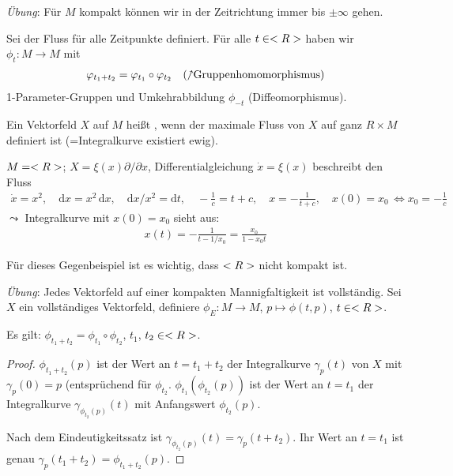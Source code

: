 \emph{Übung}: Für $M$ kompakt können wir in der Zeitrichtung immer bis $\pm\infty$ gehen.

\begin{remark}
	Sei der Fluss für alle Zeitpunkte definiert. Für alle $t\in \R$ haben wir $\phi_t\colon M\to M$ mit \begin{align*}
		\phi_{t_1+t_2} = \phi_{t_1}\circ\phi_{t_2}\quad(\nnearrow\!\!\text{Gruppenhomomorphismus})
	\end{align*}
	1-Parameter-Gruppen und Umkehrabbildung $\phi_{-t}$ (Diffeomorphismus).
\end{remark}

\begin{definition}
	Ein Vektorfeld $X$ auf $M$ heißt , wenn der maximale Fluss von $X$ auf ganz $R\times M$ definiert ist (=Integralkurve existiert ewig).
\end{definition}

\begin{example}
	$M=\R$; $X=\xi(x)\partial\slash\partial x$, Differentialgleichung $\dot x = \xi(x)$ beschreibt den Fluss \begin{align*}
		\dot x = x^2,\quad \mathrm dx = x^2\,\mathrm dx,\quad \mathrm dx\slash x^2 = \mathrm dt,\quad -\frac1c = t+c,\quad x=-\frac1{t+c},\quad x(0) = x_0\,\Leftrightarrow x_0=-\frac1c
	\end{align*}
	$\leadsto$ Integralkurve mit $x(0) = x_0$ sieht aus: \begin{align*}
		x(t) = -\frac{1}{t-1\slash x_0} = \frac{x_0}{1-x_0 t}
	\end{align*}
\end{example}

\begin{remark}
	Für dieses Gegenbeispiel ist es wichtig, dass $\R$ nicht kompakt ist.
\end{remark}

\emph{Übung}: Jedes Vektorfeld auf einer kompakten Mannigfaltigkeit ist vollständig. Sei $X$ ein vollständiges Vektorfeld, definiere $\phi_E\colon M\to M$, $p\mapsto \phi(t,p)$, $t\in \R$.

\begin{proposition}
	Es gilt: $\phi_{t_1+t_2} = \phi_{t_1}\circ\phi_{t_2}$, $t_1$, $t_2\in\R$.
\end{proposition}
\begin{proof}
	$\phi_{t_1+t_2}(p)$ ist der Wert an $t=t_1+t_2$ der Integralkurve $\gamma_p(t)$ von $X$ mit $\gamma_p(0) = p$ (entsprüchend für $\phi_{t_2}$. $\phi_{t_1}(\phi_{t_2}(p))$ ist der Wert an $t=t_1$ der Integralkurve $\gamma_{\phi_{t_2}(p)}(t)$ mit Anfangswert $\phi_{t_2}(p)$.
	
	Nach dem Eindeutigkeitssatz ist $\gamma_{\phi_{t_2}(p)}(t) = \gamma_p(t+t_2)$. Ihr Wert an $t=t_1$ ist genau $\gamma_p(t_1+t_2) = \phi_{t_1+t_2}(p)$.
\end{proof}

